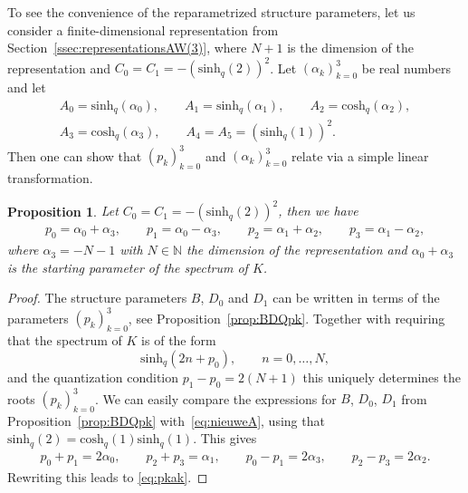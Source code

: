 \documentclass[pdftex]{sigma}
\numberwithin{equation}{section}
\newtheorem{Proposition}[Theorem]{Proposition}
 { \theoremstyle{definition}
\newtheorem{Definition}[Theorem]{Definition}
\newtheorem{Note}[Theorem]{Note}
\newtheorem{Example}[Theorem]{Example}
\newtheorem{Remark}[Theorem]{Remark} }
\newcommand{\NN}{\mathbb{N}}
\newcommand{\chq}{\mathrm{cosh}_q}
\newcommand{\shq}{\mathrm{sinh}_q}
\begin{document}
To see the convenience of the reparametrized structure parameters, let us consider a finite-dimensional representation from Section~\ref{ssec:representationsAW(3)}, where $N+1$ is the dimension of the representation and $C_0=C_1=-(\shq(2))^2$. Let $(\alpha_k)_{k=0}^3$ be real numbers and let
\begin{gather}
		A_0=\shq(\alpha_0),\qquad A_1=\shq(\alpha_1),\qquad A_2=\chq(\alpha_2),\nonumber\\
A_3=\chq(\alpha_3), \qquad A_4=A_5=(\shq(1))^2.\label{eq:Aalpha}
\end{gather}
Then one can show that $(p_k)_{k=0}^3$ and $(\alpha_k)_{k=0}^3$ relate via a simple linear transformation.
\begin{Proposition}
	Let $C_0=C_1=-(\shq(2))^2$, then we have 	
	\begin{gather}
		p_0=\alpha_0+\alpha_3,\qquad p_1=\alpha_0-\alpha_3,\qquad p_2=\alpha_1+\alpha_2,\qquad p_3=\alpha_1 -\alpha_2,\label{eq:pkak}
	\end{gather}
where $\alpha_3=-N-1$ with $N\in\NN$ the dimension of the representation and $\alpha_0+\alpha_3$ is the starting parameter of the spectrum of $K$.
\end{Proposition}
\begin{proof}
The structure parameters $B$, $D_0$ and $D_1$ can be written in terms of the parameters $(p_k)_{k=0}^3$, see Proposition~\ref{prop:BDQpk}. Together with requiring that the spectrum of $K$ is of the form
	\[
	\shq(2n+p_0),\qquad n=0,\ldots,N,
	\]
	and the quantization condition $p_1-p_0=2(N+1)$ this uniquely determines the roots $(p_k)_{k=0}^3$. We can easily compare the expressions for $B$, $D_0$, $D_1$ from Proposition~\ref{prop:BDQpk} with~\eqref{eq:nieuweA}, using that $\shq(2)=\chq(1)\shq(1)$. This gives
	\begin{gather*}
		p_0+p_1=2\alpha_0,\qquad p_2+p_3=\alpha_1,\qquad p_0-p_1=2\alpha_3,\qquad p_2-p_3=2\alpha_2.
	\end{gather*}
	Rewriting this leads to \eqref{eq:pkak}.
\end{proof}
\end{document}
